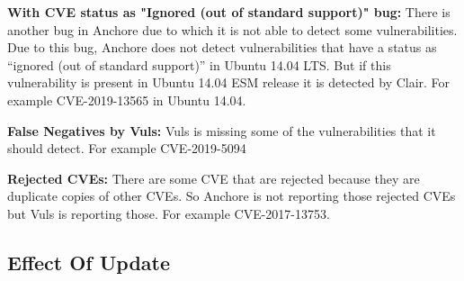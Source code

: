 \documentclass[a4paper,num-refs]{oup-contemporary}
\begin{document}
\textbf{With CVE status as "Ignored (out of standard support)" bug:} There is another bug in Anchore due to 
		which it is not able to detect some vulnerabilities. Due to this bug, Anchore does not detect 
		vulnerabilities that have a status as “ignored (out of standard support)” in Ubuntu 14.04 LTS. 
		But if this vulnerability is present in Ubuntu 14.04 ESM release it is detected by Clair. 
		For example CVE-2019-13565 in Ubuntu 14.04.


\textbf{False Negatives by Vuls:} Vuls is missing some of the vulnerabilities that it should detect. 
		For example CVE-2019-5094

\textbf{Rejected CVEs:} There are some CVE that are rejected because they are duplicate copies of other CVEs. 
	So Anchore is not reporting those rejected CVEs but Vuls is reporting those. For example CVE-2017-13753.

\subsection{Effect Of Update}

\end{document}
